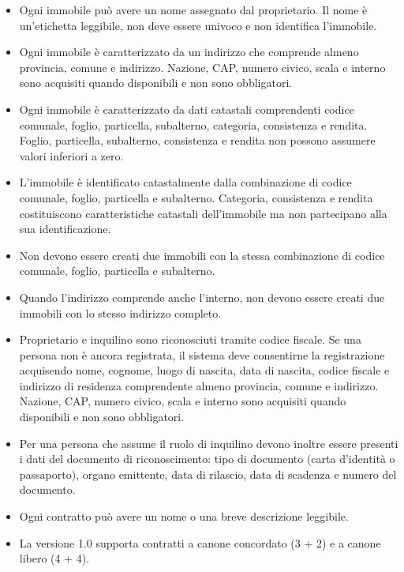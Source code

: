 \documentclass[12pt,a4paper]{article}
\begin{document}
\begin{itemize}
    \item Ogni immobile può avere un nome assegnato dal proprietario. Il nome è un'etichetta
          leggibile, non deve essere univoco e non identifica l'immobile.
    \item Ogni immobile è caratterizzato da un indirizzo che comprende almeno provincia,
          comune e indirizzo. Nazione, CAP, numero civico, scala e interno sono acquisiti
          quando disponibili e non sono obbligatori.
      \item Ogni immobile è caratterizzato da dati catastali comprendenti codice
            comunale, foglio, particella, subalterno, categoria, consistenza e rendita.
            Foglio, particella, subalterno, consistenza e rendita non possono assumere
            valori inferiori a zero.
      \item L'immobile è identificato catastalmente dalla combinazione di codice comunale,
            foglio, particella e subalterno. Categoria, consistenza e rendita costituiscono
            caratteristiche catastali dell'immobile ma non partecipano alla sua identificazione.
      \item Non devono essere creati due immobili con la stessa combinazione di codice comunale,
            foglio, particella e subalterno.
      \item Quando l'indirizzo comprende anche l'interno, non devono essere creati due immobili
            con lo stesso indirizzo completo.
    \item Proprietario e inquilino sono riconosciuti tramite codice fiscale.
            Se una persona non è ancora registrata, il sistema deve consentirne
            la registrazione acquisendo nome, cognome, luogo di nascita,
            data di nascita, codice fiscale e indirizzo di residenza comprendente almeno
            provincia, comune e indirizzo. Nazione, CAP, numero civico, scala e interno
            sono acquisiti quando disponibili e non sono obbligatori.
      \item Per una persona che assume il ruolo di inquilino devono inoltre essere
            presenti i dati del documento di riconoscimento: tipo di documento
            (carta d'identità o passaporto), organo emittente, data di rilascio,
            data di scadenza e numero del documento.
    \item Ogni contratto può avere un nome o una breve descrizione leggibile.
    \item La versione 1.0 supporta contratti a canone concordato (3 + 2) e a canone libero (4 + 4).

\end{itemize}
\end{document}
